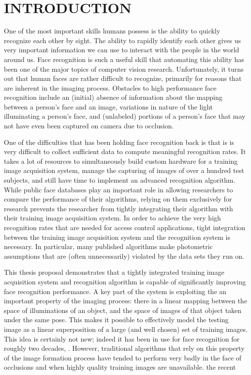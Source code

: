 \chapter{INTRODUCTION}
\label{chap:introduction}

One of the most important skills humans possess is the ability to quickly recognize each other by sight.   The ability to rapidly identify each other gives us very important information we can use to interact with the people in the world around us.  Face recognition is such a useful skill that automating this ability has been one of the major topics of computer vision research.  Unfortunately, it turns out that human faces are rather difficult to recognize, primarily for reasons that are inherent in the imaging process.  Obstacles to high performance face recognition include an (initial) absence of information about the mapping between a person's face and an image, variations in nature of the light illuminating a person's face, and (unlabeled) portions of a person's face that may not have even been captured on camera due to occlusion.  

One of the difficulties that has been holding face recognition back is that is is very difficult to collect sufficient data to compute meaningful recognition rates.  It takes a lot of resources to simultaneously build custom hardware for a training image acquisition system, manage the capturing of images of over a hundred test subjects, and still have time to implement an advanced recognition algorithm.  While public face databases play an important role in allowing researchers to compare the performance of their algorithms, relying on them exclusively for research prevents the researcher from tightly integrating their algorithm with their training image acquisition system.  In order to achieve the very high recognition rates that are needed for access control applications, tight integration between the training image acquisition system and the recognition system is necessary.  In particular, many published algorithms make photometric assumptions that are (often unnecessarily) violated by the data sets they run on.

This thesis proposal demonstrates that a tightly integrated training image acquisition system and recognition algorithm is capable of significantly improving face recognition performance.  A key part of the system is exploiting the an important property of the imaging process:  there in a linear mapping between the space of illuminations of an object, and the space of images of that object taken under the same pose.  This makes it possible to effectively model the testing image as a linear superposition of a large (and well chosen) set of training images.  This idea is certainly not new; indeed it has been in use for face recognition for roughly two decades, \cite{Turk1991-CVPR}.  However, traditional algorithms that rely on this property of the image formation process have tended to perform very badly in the face of occlusions and when highly quality training images are unavailable.  the recent 

